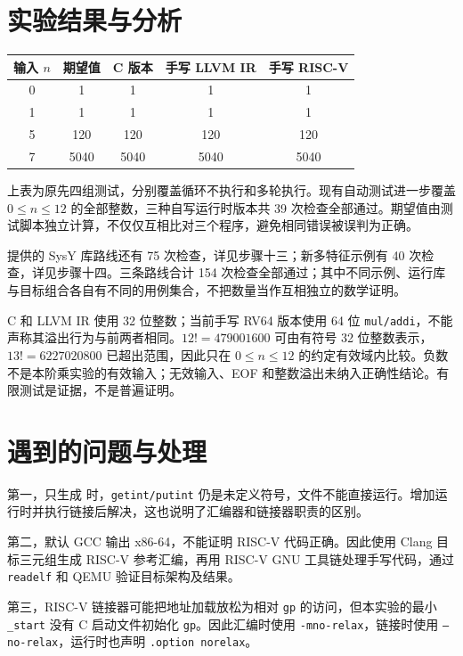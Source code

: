 \documentclass[UTF8,a4paper,12pt]{ctexart}
\begin{document}
\section{实验结果与分析}

\begin{center}
\begin{tabular}{ccccc}
\toprule
输入 $n$ & 期望值 & C 版本 & 手写 LLVM IR & 手写 RISC-V \\
\midrule
0 & 1 & 1 & 1 & 1 \\
1 & 1 & 1 & 1 & 1 \\
5 & 120 & 120 & 120 & 120 \\
7 & 5040 & 5040 & 5040 & 5040 \\
\bottomrule
\end{tabular}
\end{center}

上表为原先四组测试，分别覆盖循环不执行和多轮执行。现有自动测试进一步覆盖 $0\leq n\leq12$ 的全部整数，三种自写运行时版本共 39 次检查全部通过。期望值由测试脚本独立计算，不仅仅互相比对三个程序，避免相同错误被误判为正确。

提供的 SysY 库路线还有 75 次检查，详见步骤十三；新多特征示例有 40 次检查，详见步骤十四。三条路线合计 154 次检查全部通过；其中不同示例、运行库与目标组合各自有不同的用例集合，不把数量当作互相独立的数学证明。

C 和 LLVM IR 使用 32 位整数；当前手写 RV64 版本使用 64 位 \texttt{mul/addi}，不能声称其溢出行为与前两者相同。$12!=479001600$ 可由有符号 32 位整数表示，$13!=6227020800$ 已超出范围，因此只在 $0\leq n\leq12$ 的约定有效域内比较。负数不是本阶乘实验的有效输入；无效输入、EOF 和整数溢出未纳入正确性结论。有限测试是证据，不是普遍证明。

\section{遇到的问题与处理}

第一，只生成  时，\texttt{getint/putint} 仍是未定义符号，文件不能直接运行。增加运行时并执行链接后解决，这也说明了汇编器和链接器职责的区别。

第二，默认 GCC 输出 x86-64，不能证明 RISC-V 代码正确。因此使用 Clang 目标三元组生成 RISC-V 参考汇编，再用 RISC-V GNU 工具链处理手写代码，通过 \texttt{readelf} 和 QEMU 验证目标架构及结果。

第三，RISC-V 链接器可能把地址加载放松为相对 \texttt{gp} 的访问，但本实验的最小 \texttt{\_start} 没有 C 启动文件初始化 \texttt{gp}。因此汇编时使用 \texttt{-mno-relax}，链接时使用 \texttt{--no-relax}，运行时也声明 \texttt{.option norelax}。
\end{document}

